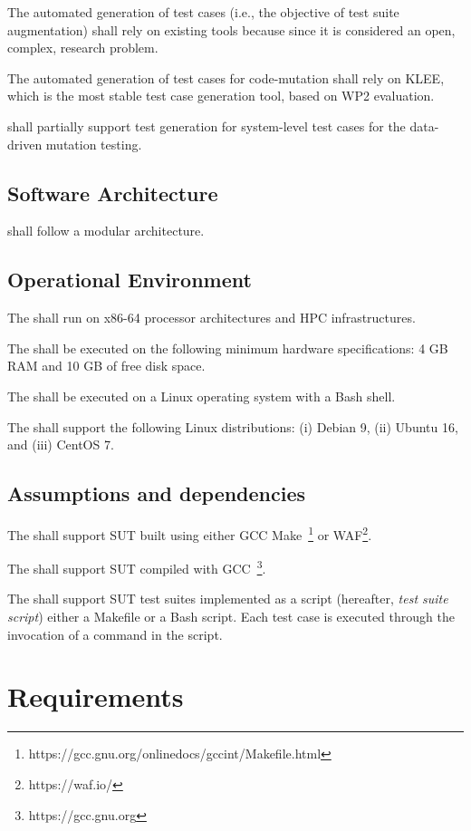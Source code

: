 \RQ{} The automated generation of test cases (i.e., the objective of test suite augmentation) shall rely on existing tools because since it is considered an open, complex, research problem.  

\RQ{} The automated generation of test cases for code-mutation shall rely on KLEE, which is the most stable test case generation tool, based on WP2 evaluation.

\RQ{} \FAQAS shall partially support test generation for system-level test cases for the data-driven mutation testing.


\section{Software Architecture}

\RQ{} \FAQAS shall follow a modular architecture.

\section{Operational Environment}

\RQ{} The \FAQAS shall run on x86-64 processor architectures and HPC infrastructures.

\RQ{} The \FAQAS shall be executed on the following minimum hardware specifications: 4 GB RAM and 10 GB of free disk space.

\RQ{} The \FAQAS shall be executed on a Linux operating system with a Bash shell.

\RQ{} The \FAQAS shall support the following Linux distributions: (i) Debian 9, (ii) Ubuntu 16, and (iii) CentOS 7.

\section{Assumptions and dependencies}

\RQ{} The \FAQAS shall support SUT built using either GCC Make~\footnote{https://gcc.gnu.org/onlinedocs/gccint/Makefile.html} or WAF\footnote{https://waf.io/}.

\RQ{} The \FAQAS shall support SUT compiled with GCC~\footnote{https://gcc.gnu.org}.

\RQ{} The \FAQAS shall support SUT test suites implemented as a script (hereafter, \emph{test suite script}) either a Makefile or a Bash script. Each test case is executed through the invocation of a command in the script.



\chapter{Requirements}

